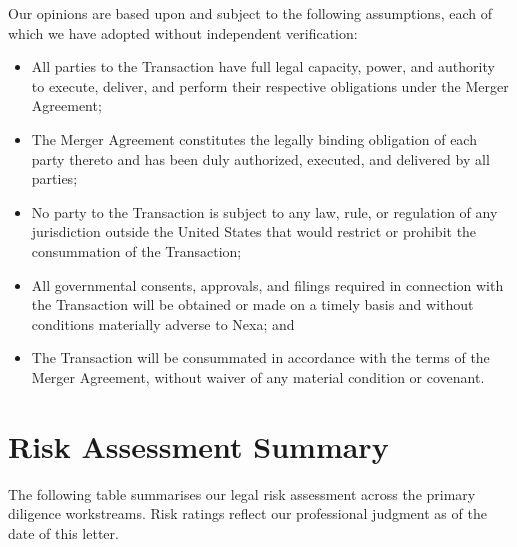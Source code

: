\documentclass[11pt,a4paper]{scrartcl}
\begin{document}
Our opinions are based upon and subject to the following assumptions, each of which we have
adopted without independent verification:

\begin{itemize}
  \item All parties to the Transaction have full legal capacity, power, and authority to execute,
    deliver, and perform their respective obligations under the Merger Agreement;
  \item The Merger Agreement constitutes the legally binding obligation of each party thereto
    and has been duly authorized, executed, and delivered by all parties;
  \item No party to the Transaction is subject to any law, rule, or regulation of any
    jurisdiction outside the United States that would restrict or prohibit the consummation
    of the Transaction;
  \item All governmental consents, approvals, and filings required in connection with the
    Transaction will be obtained or made on a timely basis and without conditions materially
    adverse to Nexa; and
  \item The Transaction will be consummated in accordance with the terms of the Merger Agreement,
    without waiver of any material condition or covenant.
\end{itemize}

\section{Risk Assessment Summary}

The following table summarises our legal risk assessment across the primary diligence workstreams.
Risk ratings reflect our professional judgment as of the date of this letter.

\vspace{4pt}
\end{document}
